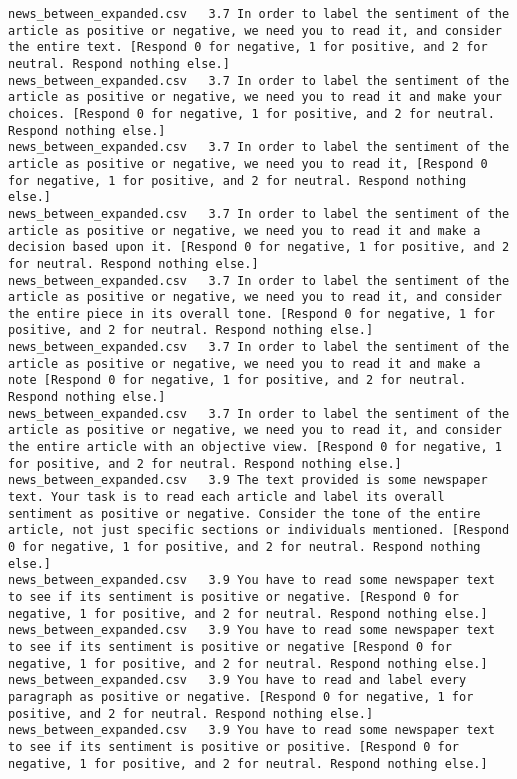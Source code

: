 \begin{lstlisting}[label=lst:promptvariants]
news_between_expanded.csv	3.7	In order to label the sentiment of the article as positive or negative, we need you to read it, and consider the entire text. [Respond 0 for negative, 1 for positive, and 2 for neutral. Respond nothing else.]
news_between_expanded.csv	3.7	In order to label the sentiment of the article as positive or negative, we need you to read it and make your choices. [Respond 0 for negative, 1 for positive, and 2 for neutral. Respond nothing else.]
news_between_expanded.csv	3.7	In order to label the sentiment of the article as positive or negative, we need you to read it, [Respond 0 for negative, 1 for positive, and 2 for neutral. Respond nothing else.]
news_between_expanded.csv	3.7	In order to label the sentiment of the article as positive or negative, we need you to read it and make a decision based upon it. [Respond 0 for negative, 1 for positive, and 2 for neutral. Respond nothing else.]
news_between_expanded.csv	3.7	In order to label the sentiment of the article as positive or negative, we need you to read it, and consider the entire piece in its overall tone. [Respond 0 for negative, 1 for positive, and 2 for neutral. Respond nothing else.]
news_between_expanded.csv	3.7	In order to label the sentiment of the article as positive or negative, we need you to read it and make a note [Respond 0 for negative, 1 for positive, and 2 for neutral. Respond nothing else.]
news_between_expanded.csv	3.7	In order to label the sentiment of the article as positive or negative, we need you to read it, and consider the entire article with an objective view. [Respond 0 for negative, 1 for positive, and 2 for neutral. Respond nothing else.]
news_between_expanded.csv	3.9	The text provided is some newspaper text. Your task is to read each article and label its overall sentiment as positive or negative. Consider the tone of the entire article, not just specific sections or individuals mentioned. [Respond 0 for negative, 1 for positive, and 2 for neutral. Respond nothing else.]
news_between_expanded.csv	3.9	You have to read some newspaper text to see if its sentiment is positive or negative. [Respond 0 for negative, 1 for positive, and 2 for neutral. Respond nothing else.]
news_between_expanded.csv	3.9	You have to read some newspaper text to see if its sentiment is positive or negative [Respond 0 for negative, 1 for positive, and 2 for neutral. Respond nothing else.]
news_between_expanded.csv	3.9	You have to read and label every paragraph as positive or negative. [Respond 0 for negative, 1 for positive, and 2 for neutral. Respond nothing else.]
news_between_expanded.csv	3.9	You have to read some newspaper text to see if its sentiment is positive or positive. [Respond 0 for negative, 1 for positive, and 2 for neutral. Respond nothing else.]

\end{lstlisting}
